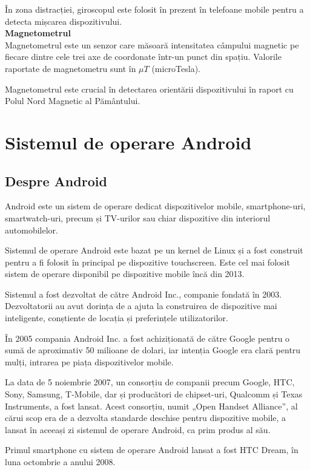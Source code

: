 \documentclass[12pt, a4paper, oneside]{article}
\begin{document}
În zona distracției, giroscopul este folosit în prezent în telefoane mobile pentru a detecta mișcarea dispozitivului.\\

\textbf{Magnetometrul}\\
Magnetometrul este un senzor care măsoară intensitatea câmpului magnetic  pe fiecare dintre cele trei axe de coordonate într-un punct din spațiu. Valorile raportate de magnetometru sunt în $\mu T$ (microTesla).

Magnetometrul este crucial în detectarea orientării dispozitivului în raport cu Polul Nord Magnetic al Pământului.

\newpage
\section{Sistemul de operare Android} \label{DetaliiAndroidOS}
\subsection{Despre Android \cite{AndroidHistoryAndroidCentral}} 
Android este un sistem de operare dedicat dispozitivelor mobile, smartphone-uri, smartwatch-uri, precum și TV-urilor sau chiar dispozitive din interiorul automobilelor.

Sistemul de operare Android este bazat pe un kernel de Linux și a fost construit pentru a fi folosit în principal pe dispozitive touchscreen. Este cel mai folosit sistem de operare disponibil pe dispozitive mobile încă din 2013.

Sistemul a fost dezvoltat de către Android Inc., companie fondată în 2003. Dezvoltatorii au avut dorința de a ajuta la construirea de dispozitive mai inteligente, conștiente de locația și preferințele utilizatorilor.

În 2005 compania Android Inc. a fost achiziționată de către Google pentru o sumă de aproximativ 50 milioane de dolari, iar intenția Google era clară pentru mulți, intrarea pe piața dispozitivelor mobile.

La data de 5 noiembrie 2007, un consorțiu de companii precum Google, HTC, Sony, Samsung, T-Mobile, dar și producători de chipset-uri, Qualcomm și Texas Instruments, a fost lansat. Acest consorțiu, numit „Open Handset Alliance”, al cărui scop era de a dezvolta standarde deschise pentru dispozitive mobile, a lansat în aceeași zi sistemul de operare Android, ca prim produs al său.

Primul smartphone cu sistem de operare Android lansat a fost HTC Dream, în luna octombrie a anului 2008.
\end{document}
